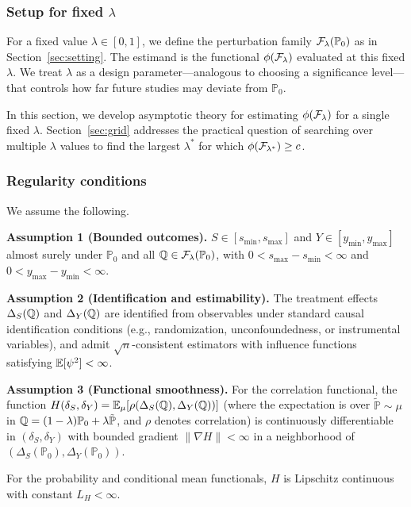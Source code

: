 \documentclass{article}
\newcommand{\PP}{\mathbb{P}}
\begin{document}
\subsubsection{Setup for fixed $\lambda$}

For a fixed value $\lambda \in [0,1]$, we define the perturbation family
$\cF_\lambda(\PP_0)$ as in Section~\ref{sec:setting}. The estimand is the functional
$\phi(\mathcal{F}_\lambda)$ evaluated at this fixed $\lambda$. We treat $\lambda$
as a design parameter—analogous to choosing a significance level—that
controls how far future studies may deviate from $\PP_0$.

In this section, we develop asymptotic theory for estimating $\phi(\mathcal{F}_\lambda)$
for a single fixed $\lambda$. Section~\ref{sec:grid} addresses the practical
question of searching over multiple $\lambda$ values to find the largest
$\lambda^*$ for which $\phi(\mathcal{F}_{\lambda^*}) \geq c$.

\subsubsection{Regularity conditions}
We assume the following.

\noindent\textbf{Assumption 1 (Bounded outcomes).}\label{ass:bounded}
$S \in [s_{\min}, s_{\max}]$ and $Y \in [y_{\min}, y_{\max}]$ almost surely
under $\PP_0$ and all $\Q \in \cF_\lambda(\PP_0)$, with
$0 < s_{\max} - s_{\min} < \infty$ and $0 < y_{\max} - y_{\min} < \infty$.

\noindent\textbf{Assumption 2 (Identification and estimability).}\label{ass:identification}
The treatment effects $\Delta_S(\mathbb{Q})$ and $\Delta_Y(\mathbb{Q})$ are identified from
observables under standard causal identification conditions (e.g., randomization,
unconfoundedness, or instrumental variables), and admit $\sqrt{n}$-consistent
estimators with influence functions satisfying $\mathbb{E}[\psi^2] < \infty$.

\noindent\textbf{Assumption 3 (Functional smoothness).}\label{ass:smoothness}
For the correlation functional, the function
$H(\delta_S, \delta_Y) = \mathbb{E}_\mu[\rho(\Delta_S(\mathbb{Q}), \Delta_Y(\mathbb{Q}))]$
(where the expectation is over $\tilde{\PP} \sim \mu$ in
$\Q = (1-\lambda)\PP_0 + \lambda\tilde{\PP}$, and $\rho$ denotes correlation)
is continuously differentiable in $(\delta_S, \delta_Y)$ with bounded gradient
$\|\nabla H\| < \infty$ in a neighborhood of $(\Delta_S(\PP_0), \Delta_Y(\PP_0))$.

For the probability and conditional mean functionals, $H$ is Lipschitz continuous
with constant $L_H < \infty$.
\end{document}
